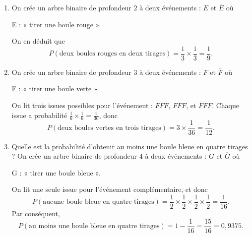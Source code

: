 {	\begin{enumerate}
		\item 
			On crée un arbre binaire de profondeur $2$ à deux événements : $E$ et $\overline{E}$ où
				\begin{center}
					E : « tirer une boule rouge ».
				\end{center}
			On en déduit que
			\[ P(\text{deux boules rouges en deux tirages}) = \frac13 \times \frac13 = \frac19. \]
		\item 
			On crée un arbre binaire de profondeur $3$ à deux événements : $F$ et $\overline{F}$ où
				\begin{center}
					F : « tirer une boule verte ».
				\end{center}
			On lit trois issues possibles pour l'événement : $FF\overline{F}$, $F\overline{F}F$, et $\overline{F}FF$.
			Chaque issue a probabilité $\frac16 \times \frac16 = \frac1{36}$, donc
			\[ P(\text{deux boules vertes en trois tirages}) = 3\times \frac1{36} = \frac1{12}. \]
		\item Quelle est la probabilité d'obtenir au moins une boule bleue en quatre tirages ?
			On crée un arbre binaire de profondeur $4$ à deux événements : $G$ et $\overline{G}$ où
				\begin{center}
					G : « tirer une boule bleue ».
				\end{center}
			On lit une seule issue pour l'événement complémentaire, et donc
			\[ P(\text{aucune boule bleue en quatre tirages}) = \frac12\times\frac12\times\frac12\times\frac12= \frac{1}{16}. \]
			Par conséquent, 
			\[ P(\text{au moins une boule bleue en quatre tirages}) =1- \frac{1}{16} = \frac{15}{16} = 0,9375. \]
	\end{enumerate}
}

